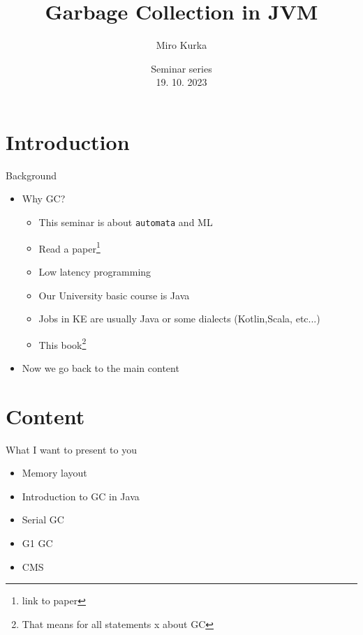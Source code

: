 \documentclass[10pt, xcolor=x11names,compress]{beamer}
\author{Miro Kurka}
\title{Garbage Collection in JVM}
\institute{Pavol Jozef Safarik University}\date{Seminar series \\ 19. 10. 2023}
\begin{document}
 \begin{frame}
 \titlepage
 \end{frame}

\section{Introduction}
\begin{frame}[label=Background]{Background}
\begin{itemize}
\item Why GC?\\
   \begin{itemize}
    \item This seminar is about \texttt{automata} and ML 
    \item Read a paper\footnote{link to paper}\
    \item Low latency programming
    \item Our University basic course is Java 
    \item Jobs in KE are usually Java or some dialects (Kotlin,Scala, etc...)
    \item This book\footnote{That means for all statements x about GC }
   \end{itemize}
\item Now we go back to the main content\\

\end{itemize}
\end{frame}

\section{Content}
\begin{frame}{What I want to present to you}
\begin{itemize}
    \item Memory layout
    \item Introduction to GC in Java 
    \item Serial GC 
    \item G1 GC 
    \item CMS 
\end{itemize}
\end{frame}
\end{document}
